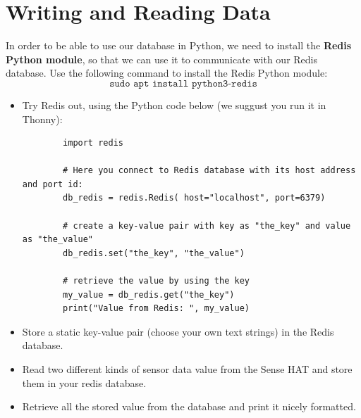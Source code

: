 \documentclass{article}
\begin{document}
\section{Writing and Reading Data}
In order to be able to use our database in Python, we need to install the \textbf{Redis Python module}, so that we can use it to communicate with our Redis database. Use the following command to install the Redis Python module:
\begin{equation}
    \texttt{sudo apt install python3-redis}
\end{equation}

\noindent

\begin{itemize}

    \item[1.] Try Redis out, using the Python code below (we suggust you run it in Thonny):
    \begin{verbatim}
        import redis

        # Here you connect to Redis database with its host address and port id:
        db_redis = redis.Redis( host="localhost", port=6379)

        # create a key-value pair with key as "the_key" and value as "the_value"
        db_redis.set("the_key", "the_value")

        # retrieve the value by using the key
        my_value = db_redis.get("the_key")
        print("Value from Redis: ", my_value)
    \end{verbatim}
       
    \item[2.] Store a static key-value pair (choose your own text strings) in the Redis database.
    \item[3.] Read two different kinds of sensor data value from the Sense HAT and store them in your redis database.
    \item[4.] Retrieve all the stored value from the database and print it nicely formatted.
\end{itemize}
\end{document}

